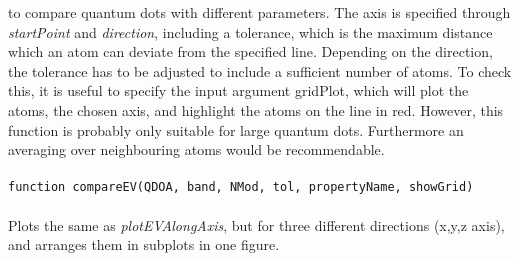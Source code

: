 		 to compare quantum dots with different parameters. The axis is specified through \textit{startPoint} and \textit{direction}, including a tolerance, which is 
		 the maximum distance which an atom can deviate from the specified line. Depending on the direction, the tolerance has to be adjusted to include 
		 a sufficient number of atoms. To check this, it is useful to specify the input argument gridPlot, which will plot the atoms, the chosen axis, and highlight 
		 the atoms on the line in red. However, this function is probably only suitable for large quantum dots. Furthermore an averaging over neighbouring atoms 
		 would be recommendable.\\\\
		\lstinline{function compareEV(QDOA, band, NMod, tol, propertyName, showGrid)}\\\\
		Plots the same as \textit{plotEVAlongAxis}, but for three different directions (x,y,z axis), and arranges them in subplots in one figure.
